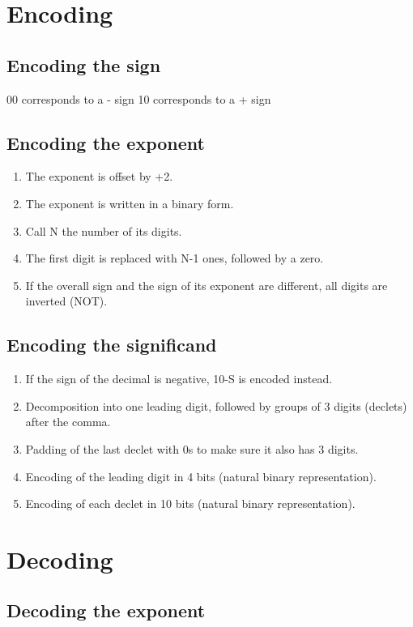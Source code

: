 \documentclass{acm_proc_article-sp}
\begin{document}
\section{Encoding}

\subsection{Encoding the sign}

00 corresponds to a - sign
10 corresponds to a + sign

\subsection{Encoding the exponent}
\begin{enumerate}
\item The exponent is offset by +2.
\item  The exponent is written in a binary form.
\item  Call N the number of its digits.
\item  The first digit is replaced with N-1 ones, followed by a zero.
\item  If the overall sign and the sign of its exponent are different, all digits are inverted (NOT).
\end{enumerate}

\subsection{Encoding the significand}
\begin{enumerate}
\item If the sign of the decimal is negative, 10-S is encoded instead.
\item Decomposition into one leading digit, followed by groups of 3 digits (declets) after the comma.
\item Padding of the last declet with 0s to make sure it also has 3 digits.
\item Encoding of the leading digit in 4 bits (natural binary representation).
\item Encoding of each declet in 10 bits (natural binary representation).
\end{enumerate}

\section{Decoding}

\subsection{Decoding the exponent}
\end{document}
